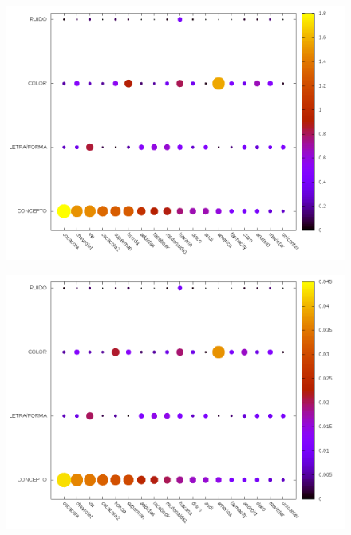 \documentclass{beamer}
\begin{document}
\begin{frame}
\begin{figure}[h]
\begin{minipage}[c]{1\textwidth}
  \end{minipage}
\end{figure}
\end{frame}

\begin{frame}
\begin{figure}[h]
 \centering
  \begin{minipage}[c]{1\textwidth}
	\centering	
	\includegraphics[scale=0.4]{target_ir.png}
  \end{minipage}
\end{figure}
\end{frame}

\begin{frame}
\begin{figure}[h]
 \centering
  \begin{minipage}[c]{1\textwidth}
	\centering	
	\includegraphics[scale=0.4]{target_irr.png}
  \end{minipage}
\end{figure}
\end{frame}
\end{document}
